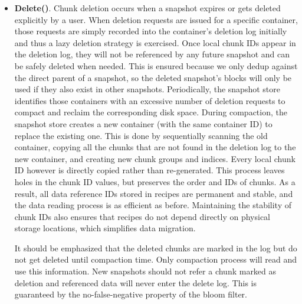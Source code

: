 \begin{itemize}
\item
\noindent\textbf{Delete()}.
Chunk deletion occurs when a snapshot expires or gets deleted explicitly by a user. 
When deletion requests are issued for a specific container,
those requests are simply recorded into the  container's deletion log initially and thus  a lazy
deletion strategy is exercised.
Once local chunk IDs appear in
the deletion log, they will not be referenced by any future snapshot and can be safely deleted when needed. 
This is ensured because we only dedup against the direct parent of a snapshot, so the deleted snapshot's blocks
will only be used if they also exist in other snapshots.
Periodically, the snapshot  store identifies those containers with an excessive
number of deletion requests to  compact and  reclaim the corresponding disk space. 
During compaction, the snapshot store creates a new container (with the same container ID) to replace the 
existing one. This is done by sequentially scanning the old container, copying all the chunks that are not 
found in the deletion log to the new container, and creating new chunk groups and indices. 
Every local chunk ID however is directly copied rather than re-generated. This
process leaves holes in the chunk ID values, but preserves the order and IDs of chunks.
As a result, all data reference IDs stored 
in recipes are permanent and stable, and the data reading process
is as efficient as before. Maintaining the stability of chunk IDs also ensures that recipes do not
depend directly on physical storage locations, which simplifies data migration.

It should be emphasized that the deleted chunks are marked in the log but do not get deleted until compaction
time.  Only compaction process will read and use this information.  
New snapshots should not refer a chunk marked as deletion
and referenced data will never enter the delete log. This is guaranteed 
by the no-false-negative property of the bloom filter.
\end{itemize}


